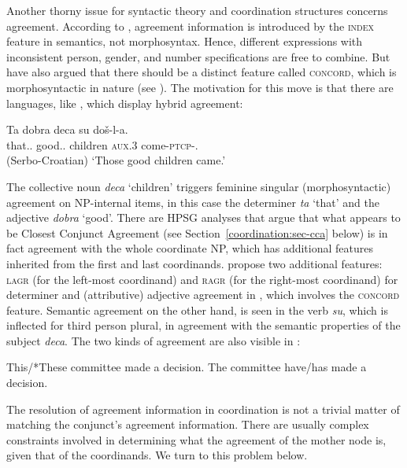 Another thorny issue for syntactic theory and coordination structures concerns agreement. According to 
\citet[Section~2.4.2]{pollardsag}, agreement information is introduced by the \textsc{index} feature in semantics, not morphosyntax. Hence, different expressions
with inconsistent person, gender, and number specifications are free to combine. But \citet[Chapter~2]{wechsler} have also argued that there should be a distinct feature called \textsc{concord}, which is morphosyntactic in nature (see ). The motivation for this move is that there are languages, like , 
which display hybrid agreement:

\ea
\gll Ta dobra deca su do\v{s}-l-a.\footnotemark\\
         that.\SG.\F{} good.\SG.\F{} children \textsc{aux}.3\PL{} come-\textsc{ptcp}-\N.\PL\\\hfill(Serbo-Croatian)
\glt `Those good children came.'
\z

\noindent
The collective noun \emph{deca} `children' triggers feminine singular (morphosyntactic) agreement on
NP-internal items, in this case the determiner \emph{ta} `that' and the adjective \emph{dobra}
`good'.  There are  HPSG
analyses that argue that what appears to be Closest Conjunct Agreement (see
Section~\ref{coordination:sec-cca} below) is in fact agreement with
the whole coordinate NP, which has additional features inherited from the first and last
coordinands. \citet[Section~5]{Villavicencio:Sadler:ea:05} propose two additional features:
\textsc{lagr} (for the left-most coordinand) and \textsc{ragr} (for the right-most coordinand) for
determiner and (attributive) adjective agreement in , which involves the
\textsc{concord} feature.  Semantic agreement  on the other hand, is seen in the
verb \emph{su}, which is inflected for third person plural, in agreement with the semantic
properties of the subject \emph{deca}. The two kinds of agreement are also visible in :

\eal
\ex This/*These committee made a decision.
\ex The committee have/has made a decision.
\zl


\noindent
The resolution of agreement information in coordination is not a trivial matter of matching the conjunct's agreement information. There are usually complex constraints involved in determining what the agreement of the mother node is, given that of the coordinands. We turn to this problem below.






